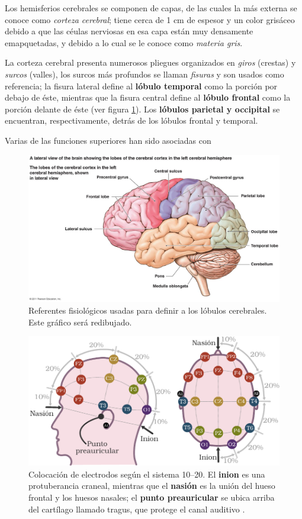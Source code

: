 Los hemisferios cerebrales se componen de capas, de las cuales la más externa se conoce como
\textit{corteza cerebral}; tiene cerca de 1 cm de espesor y un color grisáceo debido a que
las céulas nerviosas en esa capa están muy densamente emapquetadas, y debido a lo cual se le conoce
como \textit{materia gris}.

La corteza cerebral presenta numerosos pliegues organizados en \textit{giros} (crestas) y
\textit{surcos} (valles), los surcos más profundos se llaman \textit{fisuras} y son usados
como referencia;
la fisura lateral define al \textbf{lóbulo temporal} como la porción por debajo de 
éste, mientras que la fisura central define al \textbf{lóbulo frontal} como la
porción delante de éste (ver figura \ref{lobulos}). Los \textbf{lóbulos parietal y occipital}
se encuentran, respectivamente, detrás de los lóbulos frontal y temporal.

Varias de las funciones superiores han sido asociadas con 

\begin{figure}
\centering
\includegraphics[width=0.8\linewidth]{./img_diagramas/brainlandmarks.jpg} 
\caption{Referentes fisiológicos usadas para definir a los lóbulos cerebrales.
Este gráfico será redibujado.
}
\label{lobulos}
\end{figure}

\begin{figure}
\centering
\includegraphics[width=\linewidth]{./img_diagramas/cabeza_proporcionada_color.pdf} 
\caption{Colocación de electrodos según el sistema 10--20. El \textbf{inion} es 
una protuberancia craneal, mientras que el \textbf{nasión} es la unión del hueso frontal y los 
huesos nasales; el \textbf{punto preauricular} se ubica arriba del cartílago llamado tragus, que 
protege el canal auditivo \cite{Butkov07}. 
}
\label{img1020}
\end{figure}

